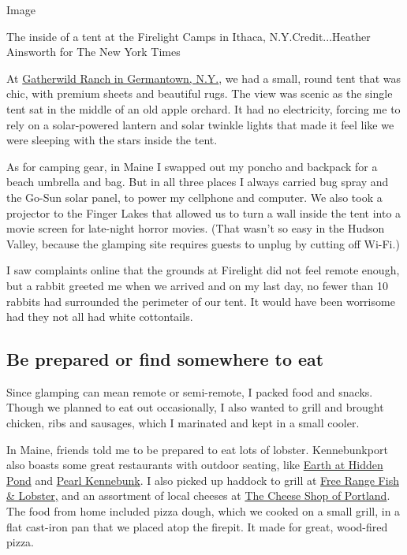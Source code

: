 Image

The inside of a tent at the Firelight Camps in Ithaca,
N.Y.Credit...Heather Ainsworth for The New York Times

At \href{http://www.gatherwild.com/}{Gatherwild Ranch in Germantown,
N.Y.}, we had a small, round tent that was chic, with premium sheets and
beautiful rugs. The view was scenic as the single tent sat in the middle
of an old apple orchard. It had no electricity, forcing me to rely on a
solar-powered lantern and solar twinkle lights that made it feel like we
were sleeping with the stars inside the tent.

As for camping gear, in Maine I swapped out my poncho and backpack for a
beach umbrella and bag. But in all three places I always carried bug
spray and the Go-Sun solar panel, to power my cellphone and computer. We
also took a projector to the Finger Lakes that allowed us to turn a wall
inside the tent into a movie screen for late-night horror movies. (That
wasn't so easy in the Hudson Valley, because the glamping site requires
guests to unplug by cutting off Wi-Fi.)

I saw complaints online that the grounds at Firelight did not feel
remote enough, but a rabbit greeted me when we arrived and on my last
day, no fewer than 10 rabbits had surrounded the perimeter of our tent.
It would have been worrisome had they not all had white cottontails.

\hypertarget{be-prepared-or-find-somewhere-to-eat}{%
\subsection{Be prepared or find somewhere to
eat}\label{be-prepared-or-find-somewhere-to-eat}}

Since glamping can mean remote or semi-remote, I packed food and snacks.
Though we planned to eat out occasionally, I also wanted to grill and
brought chicken, ribs and sausages, which I marinated and kept in a
small cooler.

In Maine, friends told me to be prepared to eat lots of lobster.
Kennebunkport also boasts some great restaurants with outdoor seating,
like \href{https://www.earthathiddenpond.com/}{Earth at Hidden Pond} and
\href{https://www.pearlkennebunk.com/}{Pearl Kennebunk}. I also picked
up haddock to grill at \href{http://freerangefish.com/}{Free Range Fish
\& Lobster,} and an assortment of local cheeses at
\href{https://www.thecheeseshopofportland.com/}{The Cheese Shop of
Portland}. The food from home included pizza dough, which we cooked on a
small grill, in a flat cast-iron pan that we placed atop the firepit. It
made for great, wood-fired pizza.


